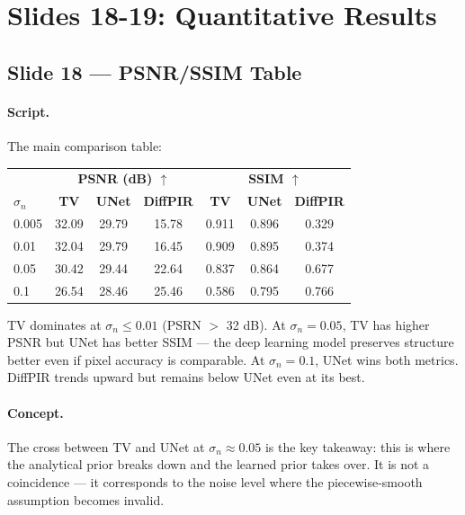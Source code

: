 \documentclass[english,11pt,a4paper]{article}
\begin{document}
\section{Slides 18-19: Quantitative Results}

\subsection{Slide 18 --- PSNR/SSIM Table}

\paragraph{Script.}
The main comparison table:

\begin{center}
\small
\begin{tabular}{l|ccc|ccc}\toprule
& \multicolumn{3}{c|}{\textbf{PSNR (dB) $\uparrow$}}
& \multicolumn{3}{c}{\textbf{SSIM $\uparrow$}}\\
$\sigma_n$ & \textbf{TV} & \textbf{UNet} & \textbf{DiffPIR}
& \textbf{TV} & \textbf{UNet} & \textbf{DiffPIR}\\\midrule
0.005 & 32.09 & 29.79 & 15.78 & 0.911 & 0.896 & 0.329\\
0.01  & 32.04 & 29.79 & 16.45 & 0.909 & 0.895 & 0.374\\
0.05  & 30.42 & 29.44 & 22.64 & 0.837 & 0.864 & 0.677\\
0.1   & 26.54 & 28.46 & 25.46 & 0.586 & 0.795 & 0.766\\\bottomrule
\end{tabular}
\end{center}

TV dominates at $\sigma_n \leq 0.01$ (PSRN $>$ 32 dB). At $\sigma_n=0.05$,
TV has higher PSNR but UNet has better SSIM --- the deep learning model
preserves structure better even if pixel accuracy is comparable. At
$\sigma_n=0.1$, UNet wins both metrics. DiffPIR trends upward but
remains below UNet even at its best.

\paragraph{Concept.}
The cross between TV and UNet at $\sigma_n \approx 0.05$ is the key
takeaway: this is where the analytical prior breaks down and the
learned prior takes over. It is not a coincidence --- it corresponds
to the noise level where the piecewise-smooth assumption becomes
invalid.
\end{document}
